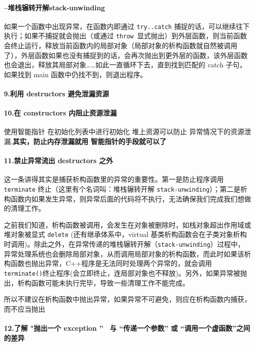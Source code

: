 \documentclass[UTF8,a4paper,12pt]{ctexbook}
\begin{document}
			\paragraph{--堆栈辗转开解stack-unwinding}如果一个函数中出现异常，在函数内即通过 \verb|try..catch| 捕捉的话，可以继续往下执行；如果不捕捉就会抛出（或通过 \verb|throw |显式抛出）到外层函数，则当前函数会终止运行，释放当前函数内的局部对象（局部对象的析构函数就自然被调用了），外层函数如果也没有捕捉到的话，会再次抛出到更外层的函数，该外层函数也会退出，释放其局部对象……如此一直循环下去，直到找到匹配的 catch 子句，如果找到 main 函数中仍找不到，则退出程序。
			
			\paragraph{9.利用 destructors 避免泄漏资源}
			\paragraph{10.在 constructors 内阻止资源泄漏} 使用智能指针 在初始化列表中进行初始化 堆上资源可以防止 异常情况下的资源泄漏,\textbf{其实，防止内存泄漏就用 智能指针的手段就可以了}
			
			\paragraph{11.禁止异常流出 destructors 之外}
				这一条讲得其实是捕获析构函数里的异常的重要性。第一是防止程序调用 \verb|terminate| 终止（这里有个名词叫：堆栈辗转开解 \verb|stack-unwinding|）；第二是析构函数内如果发生异常，则异常后面的代码将不执行，无法确保我们完成我们想做的清理工作。
				
				之前我们知道，析构函数被调用，会发生在对象被删除时，如栈对象超出作用域或堆对象被显式 \verb|delete| (还有继承体系中，virtual 基类析构函数会在子类对象析构时调用)。除此之外，在异常传递的堆栈辗转开解（\verb|stack-unwinding|）过程中，异常处理系统也会删除局部对象，从而调用局部对象的析构函数，而此时如果该析构函数也抛出异常，C++程序是无法同时处理两个异常的，就会调用 \verb|terminate()|终止程序(会立即终止，连局部对象也不释放)。另外，如果异常被抛出，析构函数可能未执行完毕，导致一些清理工作不能完成。
				
				所以不建议在析构函数中抛出异常，如果异常不可避免，则应在析构函数内捕获，而不应当抛出
				
			\paragraph{12.了解 "抛出一个 exception ”  与 “传递一个参数” 或 “调用一个虚函数”之间的差异}
\end{document}
